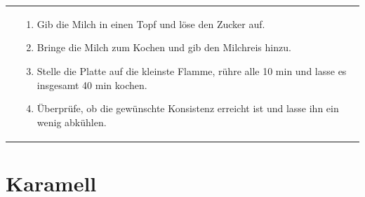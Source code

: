\documentclass[a4paper, 12pt]{scrbook} 								%
\numberwithin{equation}{section} 									%
\begin{document}
\begin{tabularx}{\textwidth}{r|L}
\begin{tabular}[t]{rr}
 	\end{tabular}			&	\begin{enumerate}[]
 									\item Gib die Milch in einen Topf und löse den Zucker auf.
									\item Bringe die Milch zum Kochen und gib den Milchreis hinzu.
									\item Stelle die Platte auf die kleinste Flamme, rühre alle 10 min und lasse es insgesamt 40 min kochen.
									\item Überprüfe, ob die gewünschte Konsistenz erreicht ist und lasse ihn ein wenig abkühlen.
 								\end{enumerate}	\\
 \end{tabularx}
 \newpage

	

	\section{Karamell}	\label{karamell}
\end{document}
